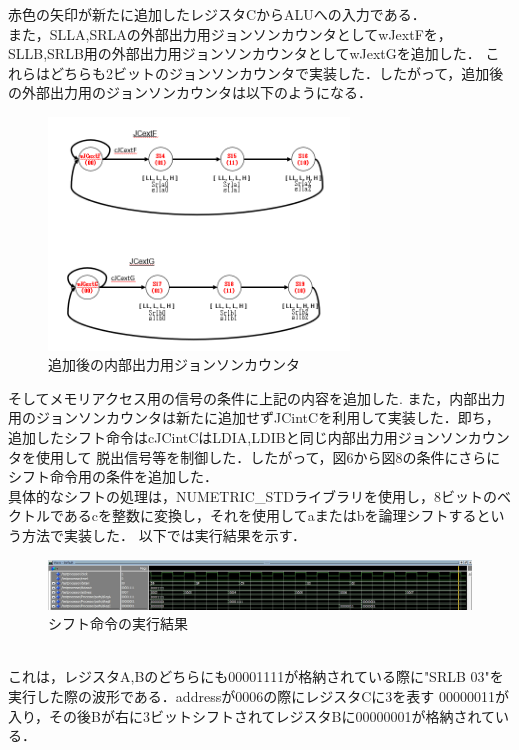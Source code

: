 \documentclass[dvipdfmx]{jarticle}
\begin{document}
赤色の矢印が新たに追加したレジスタCからALUへの入力である．\\
また，SLLA,SRLAの外部出力用ジョンソンカウンタとしてwJextFを，SLLB,SRLB用の外部出力用ジョンソンカウンタとしてwJextGを追加した．
これらはどちらも2ビットのジョンソンカウンタで実装した．したがって，追加後の外部出力用のジョンソンカウンタは以下のようになる．
\clearpage
\begin{figure}[h]
  \centering
  \includegraphics[width = 8cm]{improveext.png}
  \caption{追加後の内部出力用ジョンソンカウンタ}
\end{figure}
そしてメモリアクセス用の信号の条件に上記の内容を追加した.
また，内部出力用のジョンソンカウンタは新たに追加せずJCintCを利用して実装した．即ち，追加したシフト命令はcJCintCはLDIA,LDIBと同じ内部出力用ジョンソンカウンタを使用して
脱出信号等を制御した．したがって，図6から図8の条件にさらにシフト命令用の条件を追加した．\\
具体的なシフトの処理は，NUMETRIC\_STDライブラリを使用し，8ビットのベクトルであるcを整数に変換し，それを使用してaまたはbを論理シフトするという方法で実装した．
以下では実行結果を示す．
\begin{figure}[h]
  \centering
  \includegraphics[width = 16cm]{result.png}
  \caption{シフト命令の実行結果}
\end{figure}
\\これは，レジスタA,Bのどちらにも00001111が格納されている際に"SRLB 03"を実行した際の波形である．addressが0006の際にレジスタCに3を表す
00000011が入り，その後Bが右に3ビットシフトされてレジスタBに00000001が格納されている．
\end{document}

